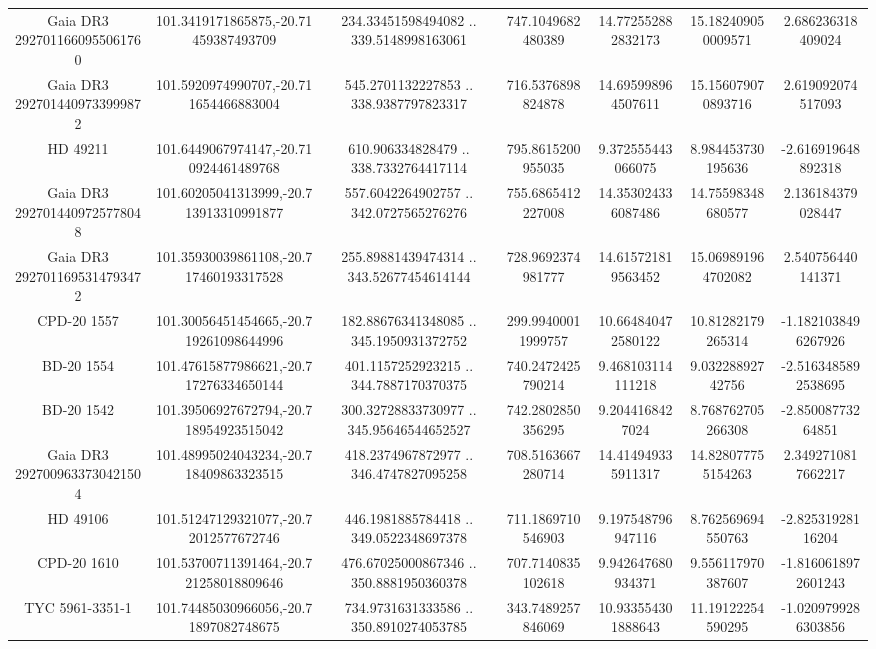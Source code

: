 \begin{table}
\begin{tabular}{ccccccc}
Gaia DR3 2927011660955061760 & 101.3419171865875,-20.71459387493709 & 234.33451598494082 .. 339.5148998163061 & 747.1049682480389 & 14.772552882832173 & 15.182409050009571 & 2.686236318409024 \\
Gaia DR3 2927014409733999872 & 101.5920974990707,-20.711654466883004 & 545.2701132227853 .. 338.9387797823317 & 716.5376898824878 & 14.695998964507611 & 15.156079070893716 & 2.619092074517093 \\
HD  49211 & 101.6449067974147,-20.710924461489768 & 610.906334828479 .. 338.7332764417114 & 795.8615200955035 & 9.372555443066075 & 8.984453730195636 & -2.616919648892318 \\
Gaia DR3 2927014409725778048 & 101.60205041313999,-20.713913310991877 & 557.6042264902757 .. 342.0727565276276 & 755.6865412227008 & 14.353024336087486 & 14.75598348680577 & 2.136184379028447 \\
Gaia DR3 2927011695314793472 & 101.35930039861108,-20.717460193317528 & 255.89881439474314 .. 343.52677454614144 & 728.9692374981777 & 14.615721819563452 & 15.069891964702082 & 2.540756440141371 \\
CPD-20  1557 & 101.30056451454665,-20.719261098644996 & 182.88676341348085 .. 345.1950931372752 & 299.99400011999757 & 10.664840472580122 & 10.81282179265314 & -1.1821038496267926 \\
BD-20  1554 & 101.47615877986621,-20.717276334650144 & 401.1157252923215 .. 344.7887170370375 & 740.2472425790214 & 9.468103114111218 & 9.03228892742756 & -2.5163485892538695 \\
BD-20  1542 & 101.39506927672794,-20.718954923515042 & 300.32728833730977 .. 345.95646544652527 & 742.2802850356295 & 9.2044168427024 & 8.768762705266308 & -2.85008773264851 \\
Gaia DR3 2927009633730421504 & 101.48995024043234,-20.718409863323515 & 418.2374967872977 .. 346.4747827095258 & 708.5163667280714 & 14.414949335911317 & 14.828077755154263 & 2.3492710817662217 \\
HD  49106 & 101.51247129321077,-20.72012577672746 & 446.1981885784418 .. 349.0522348697378 & 711.1869710546903 & 9.197548796947116 & 8.762569694550763 & -2.82531928116204 \\
CPD-20  1610 & 101.53700711391464,-20.721258018809646 & 476.67025000867346 .. 350.8881950360378 & 707.7140835102618 & 9.942647680934371 & 9.556117970387607 & -1.8160618972601243 \\
TYC 5961-3351-1 & 101.74485030966056,-20.71897082748675 & 734.9731631333586 .. 350.8910274053785 & 343.7489257846069 & 10.933554301888643 & 11.19122254590295 & -1.0209799286303856 \\

\end{tabular}
\end{table}
